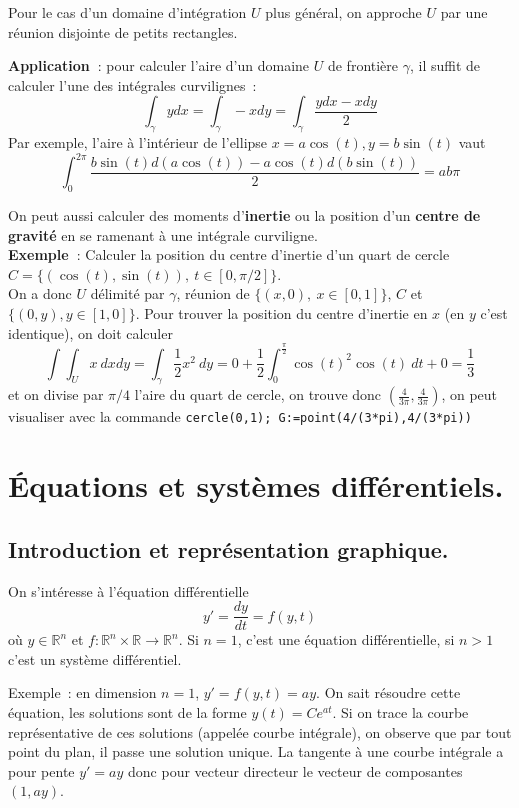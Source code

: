 \documentclass[a4paper,11pt]{article}
\newcommand{\R}{{\mathbb{R}}}
\begin{document}
\begin{giacjshere}
Pour le cas d'un domaine d'int\'egration $U$ plus g\'en\'eral, on approche $U$
par une r\'eunion disjointe de petits rectangles.

{\bf Application~}: pour calculer l'aire d'un domaine $U$ de fronti\`ere
$\gamma$,  il suffit de
calculer l'une des int\'egrales curvilignes~:
$$ \int_\gamma y dx= \int_\gamma -x dy = \int_\gamma \frac{y dx - x
  dy}{2}$$
Par exemple, l'aire \`a l'int\'erieur de l'ellipse $x=a\cos(t),
y=b\sin(t)$ vaut
$$ \int_0^{2\pi} \frac{b \sin(t) d(a\cos(t)) - a\cos(t)
  d(b\sin(t))}{2} = ab\pi $$

On peut aussi calculer des moments d'{\bf inertie} 
ou la position d'un {\bf centre de gravit\'e}
en se ramenant \`a une int\'egrale curviligne.\\
{\bf Exemple~}: Calculer la position du centre d'inertie d'un quart
de cercle $C=\{(\cos(t),\sin(t)), \ t \in [0,\pi/2]\}$.\\
On a donc $U$ d\'elimit\'e par $\gamma$, r\'eunion de $\{(x,0), \ x
\in [0,1]\} $, $C$ et $\{(0,y), y \in [1,0]\}$.
Pour trouver la position du centre
d'inertie en $x$ (en $y$ c'est identique), on doit calculer
$$ \int \int_U x \ dx dy = \int_\gamma \frac12 x^2 \ dy
= 0 + \frac12 \int_0^{\frac{\pi}{2}} \cos(t)^2 \cos(t) \ dt + 0= \frac13$$
et on divise par $\pi/4$ l'aire du quart de cercle, on trouve
donc $(\frac{4}{3\pi},\frac{4}{3\pi})$, on peut visualiser avec
la commande \verb|cercle(0,1); G:=point(4/(3*pi),4/(3*pi))|

\section{\'Equations et syst\`emes diff\'erentiels.} \label{sec:ode}

\subsection{Introduction et repr\'esentation graphique.}
On s'int\'eresse \`a l'\'equation diff\'erentielle
\begin{equation} \label{eq:diff}
 y'=\frac{dy}{dt}=f(y,t)
\end{equation}
o\`u $y \in \R^n$ et $f: \R^n \times \R \rightarrow \R^n$.
Si $n=1$, c'est une \'equation diff\'erentielle, si $n>1$ c'est
un syst\`eme diff\'erentiel.

Exemple~: en dimension $n=1$, $y'=f(y,t)=ay$. On sait r\'esoudre cette
\'equation, les solutions sont de la forme $y(t)=Ce^{at}$. Si on trace
la courbe repr\'esentative de ces solutions (appel\'ee
courbe int\'egrale), on observe que par
tout point du plan, il passe une solution unique. La tangente
\`a une courbe int\'egrale a pour pente $y'=ay$ donc pour
vecteur directeur le vecteur de composantes $(1,ay)$.


\end{giacjshere}
\end{document}
